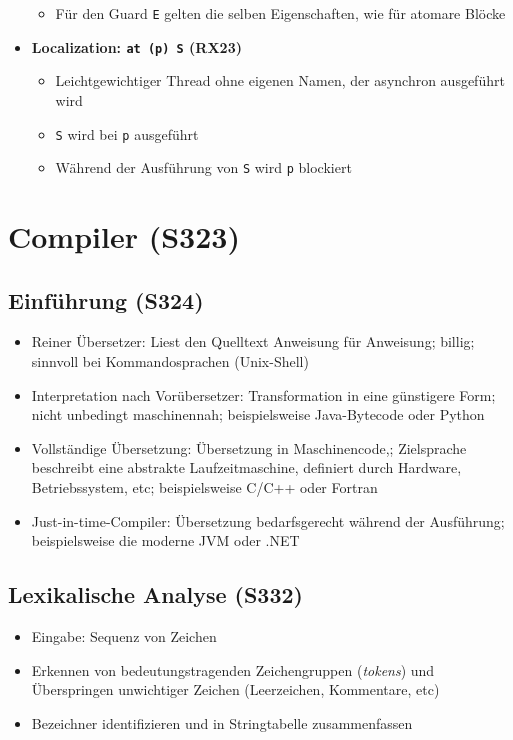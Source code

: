 \begin{itemize}
\begin{itemize}
		\item Für den Guard \texttt{E} gelten die selben Eigenschaften, wie für atomare Blöcke
	\end{itemize}
	\item \textbf{Localization: \texttt{at (p) S} (RX23)}
	\begin{itemize}
		\item Leichtgewichtiger Thread ohne eigenen Namen, der asynchron ausgeführt wird
		\item \texttt{S} wird bei \texttt{p} ausgeführt
		\item Während der Ausführung von \texttt{S} wird \texttt{p} blockiert
	\end{itemize}
\end{itemize}



\section{Compiler (S323)}

\subsection{Einführung (S324)}
\begin{itemize}
	\item Reiner Übersetzer: Liest den Quelltext Anweisung für Anweisung; billig; sinnvoll bei Kommandosprachen (Unix-Shell)
	\item Interpretation nach Vorübersetzer: Transformation in eine günstigere Form; nicht unbedingt maschinennah; beispielsweise Java-Bytecode oder Python
	\item Vollständige Übersetzung: Übersetzung in Maschinencode,; Zielsprache beschreibt eine abstrakte Laufzeitmaschine, definiert durch Hardware, Betriebssystem, etc; beispielsweise C/C++ oder Fortran
	\item Just-in-time-Compiler: Übersetzung bedarfsgerecht während der Ausführung; beispielsweise die moderne JVM oder .NET
\end{itemize}


\subsection{Lexikalische Analyse (S332)}
\begin{itemize}
	\item Eingabe: Sequenz von Zeichen
	\item Erkennen von bedeutungstragenden Zeichengruppen (\textit{tokens}) und Überspringen unwichtiger Zeichen (Leerzeichen, Kommentare, etc)
	\item Bezeichner identifizieren und in Stringtabelle zusammenfassen
\end{itemize}

